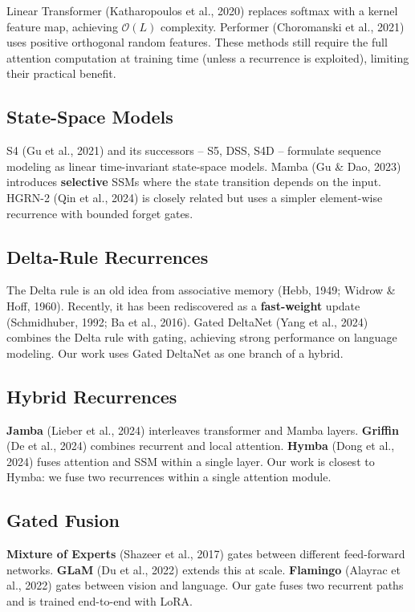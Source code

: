Linear Transformer (Katharopoulos et al., 2020) replaces softmax with a 
kernel feature map, achieving $\mathcal{O}(L)$ complexity. Performer 
(Choromanski et al., 2021) uses positive orthogonal random features. These 
methods still require the full attention computation at training time 
(unless a recurrence is exploited), limiting their practical benefit.

\subsection{State-Space Models}

S4 (Gu et al., 2021) and its successors -- S5, DSS, S4D -- formulate sequence 
modeling as linear time-invariant state-space models. Mamba (Gu \& Dao, 2023) 
introduces \textbf{selective} SSMs where the state transition depends on the 
input. HGRN-2 (Qin et al., 2024) is closely related but uses a simpler 
element-wise recurrence with bounded forget gates.

\subsection{Delta-Rule Recurrences}

The Delta rule is an old idea from associative memory (Hebb, 1949; Widrow \& 
Hoff, 1960). Recently, it has been rediscovered as a \textbf{fast-weight} update 
(Schmidhuber, 1992; Ba et al., 2016). Gated DeltaNet (Yang et al., 2024) 
combines the Delta rule with gating, achieving strong performance on 
language modeling. Our work uses Gated DeltaNet as one branch of a hybrid.

\subsection{Hybrid Recurrences}

\textbf{Jamba} (Lieber et al., 2024) interleaves transformer and Mamba layers. 
\textbf{Griffin} (De et al., 2024) combines recurrent and local attention. 
\textbf{Hymba} (Dong et al., 2024) fuses attention and SSM within a single layer. 
Our work is closest to Hymba: we fuse two recurrences within a single 
attention module.

\subsection{Gated Fusion}

\textbf{Mixture of Experts} (Shazeer et al., 2017) gates between different 
feed-forward networks. \textbf{GLaM} (Du et al., 2022) extends this at scale. 
\textbf{Flamingo} (Alayrac et al., 2022) gates between vision and language. 
Our gate fuses two recurrent paths and is trained end-to-end with LoRA.

